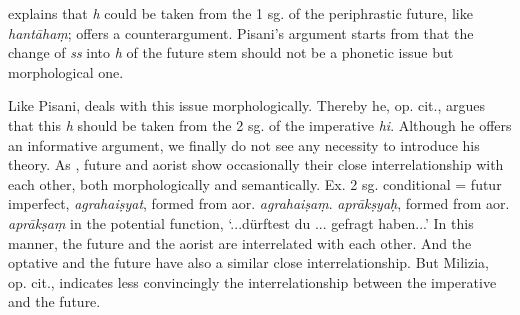 \documentclass[11pt]{article}
\newcommand*\ṛ{r\symbol{"325}}
\newcommand*\Ṛ{R\symbol{"325}}
\newcommand*\ṝ{r\symbol{"304}\symbol{"325}}
\newcommand*\Ṝ{R\symbol{"304}\symbol{"325}}
\newcommand*\ḷ{l\symbol{"325}}
\newcommand*\ḹ{l\symbol{"304}\symbol{"325}}
\newcommand*\Ḷ{L\symbol{"325}}
\newcommand*\Ḹ{L\symbol{"304}\symbol{"325}}
\begin{document}

\citet[§ 7]{pisani:1952} explains that \textit{h} could be taken from the 1 sg. of the periphrastic future, like \textit{hantāhaṃ}; \citet[fn. 159, p. 79]{berger:1955} offers a counterargument.
Pisani's argument starts from that the change of \textit{ss} into \textit{h} of the future stem should not be a phonetic issue but morphological one.

Like Pisani, \citet{Milizia:2011} deals with this issue morphologically.
Thereby he, op. cit., argues that this \textit{h} should be taken from the 2 sg. of the imperative \textit{hi}.
Although he offers an informative argument, we finally do not see any necessity to introduce his theory.
As \citet[300]{Thieme:1981}, future and aorist show occasionally their close interrelationship with each other, both morphologically and semantically.
Ex. 2 sg. conditional = futur imperfect, \textit{agrahaiṣyat}, formed from aor. \textit{agrahaiṣaṃ}.
\textit{aprākṣyaḥ}, formed from aor. \textit{aprākṣaṃ} in the potential function, `...dürftest du ... gefragt haben...'
In this manner, the future and the aorist are interrelated with each other.
And the optative and the future have also a similar close interrelationship.
But Milizia, op. cit., indicates less convincingly the interrelationship between the imperative and the future.

\end{document}
